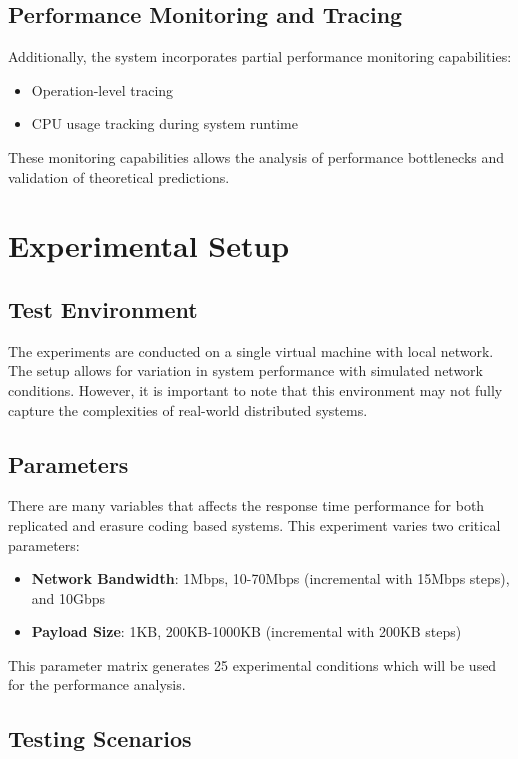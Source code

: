 \subsection{Performance Monitoring and Tracing}

Additionally, the system incorporates partial performance monitoring capabilities:
\begin{itemize}
\item Operation-level tracing
\item CPU usage tracking during system runtime
\end{itemize}

These monitoring capabilities allows the analysis of performance bottlenecks and validation of theoretical predictions.

\section{Experimental Setup}

\subsection{Test Environment}

The experiments are conducted on a single virtual machine with local network. The setup allows for variation in system performance with simulated network conditions. However, it is important to note that this environment may not fully capture the complexities of real-world distributed systems.

\subsection{Parameters}

There are many variables that affects the response time performance for both replicated and erasure coding based systems. This experiment varies two critical parameters:
\begin{itemize}
\item \textbf{Network Bandwidth}: 1Mbps, 10-70Mbps (incremental with 15Mbps steps), and 10Gbps
\item \textbf{Payload Size}: 1KB, 200KB-1000KB (incremental with 200KB steps)
\end{itemize}

This parameter matrix generates 25 experimental conditions which will be used for the performance analysis.

\subsection{Testing Scenarios}

